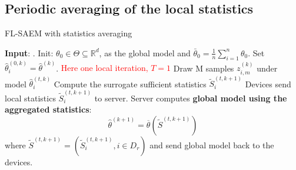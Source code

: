 \documentclass[11pt]{article}
\theoremstyle{t}
\begin{document}
\subsection{Periodic averaging of the local statistics}

\begin{algorithm}[H]
\caption{FL-SAEM with statistics averaging} \label{alg:flsaem2}
\begin{algorithmic}[1]
\STATE \textbf{Input}: .
\STATE Init: $\theta_{0} \in \Theta \subseteq \mathbb R^d $, as the global model and $\bar{\theta}_0 =  \frac{1}{n} \sum_{i=1}^n \theta_0$.
\STATE Set $\hat{\theta}^{(0,k)}_i = \hat{\theta}^{(k)}$.
\STATE \textcolor{red}{ Here one local iteration, $T=1$}
\STATE Draw M samples $z_{i,m}^{(k)}$ under model $\hat{\theta}^{(t,k)}_i$
\STATE Compute the surrogate sufficient statistics $\tilde{S}_{i}^{(t,k+1)}$
\ENDFOR
\STATE Devices send local statistics $\tilde{S}_{i}^{(t,k+1)}$ to server.
\ENDFOR
\STATE Server computes \textbf{global model using the aggregated statistics}:
$$
\hat{\theta}^{(k+1)} = \overline{\theta}( \tilde{S}^{(t,k+1)}) 
$$
where $\tilde{S}^{(t,k+1)} = (\tilde{S}_i^{(t,k+1)}, i \in D_r)$  and send global model back to the devices. 
\ENDFOR
\end{algorithmic}
\end{algorithm}



\newpage






\end{document}
